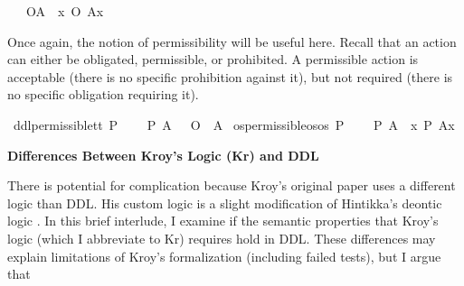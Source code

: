 \begin{isabellebody}
\ \ \ {\isachardoublequoteopen}\isactrlemph O{\isacharbraceleft}A{\isacharbraceright}\ {\isasymequiv}\ {\isasymlambda}x{\isachardot}\ {\isacharparenleft}O\ {\isacharbraceleft}A{\isacharparenleft}x{\isacharparenright}{\isacharbraceright}{\isacharparenright}{\isachardoublequoteclose}%
\begin{isamarkuptext}%
Once again, the notion of permissibility will be useful here. Recall that an action can either be 
obligated, permissible, or prohibited. A permissible action is acceptable (there is no specific prohibition 
against it), but not required (there is no specific obligation requiring it).%
\end{isamarkuptext}\isamarkuptrue%
\isamarkupfalse%
\ ddl{\isacharunderscore}permissible{\isacharcolon}{\isacharcolon}{\isachardoublequoteopen}t{\isasymRightarrow}t{\isachardoublequoteclose}\ {\isacharparenleft}{\isachardoublequoteopen}P\ {\isacharbraceleft}{\isacharunderscore}{\isacharbraceright}{\isachardoublequoteclose}{\isacharparenright}\isanewline
\ \ \ {\isachardoublequoteopen}P\ {\isacharbraceleft}A{\isacharbraceright}\ {\isasymequiv}\ \isactrlbold {\isasymnot}\ {\isacharparenleft}O\ {\isacharbraceleft}\isactrlbold {\isasymnot}\ A{\isacharbraceright}{\isacharparenright}{\isachardoublequoteclose}\isanewline
{}\isamarkupfalse%
\ os{\isacharunderscore}permissible{\isacharcolon}{\isacharcolon}{\isachardoublequoteopen}os{\isasymRightarrow}os{\isachardoublequoteclose}\ {\isacharparenleft}{\isachardoublequoteopen}\isactrlemph P\ {\isacharbraceleft}{\isacharunderscore}{\isacharbraceright}{\isachardoublequoteclose}{\isacharparenright}\isanewline
\ \ \ {\isachardoublequoteopen}\isactrlemph P\ {\isacharbraceleft}A{\isacharbraceright}\ {\isasymequiv}\ {\isasymlambda}x{\isachardot}\ P\ {\isacharbraceleft}A{\isacharparenleft}x{\isacharparenright}{\isacharbraceright}{\isachardoublequoteclose}%
\begin{isamarkuptext}%
\noindent \textbf{Differences Between Kroy's Logic (Kr) and DDL}%
\end{isamarkuptext}\isamarkuptrue%
%
\begin{isamarkuptext}%
There is potential for complication because Kroy's original paper uses a different logic than DDL. 
His custom logic is a slight modification of Hintikka's deontic logic \citep{hintikka}. In this brief interlude, 
I examine if the semantic properties that Kroy's logic (which I abbreviate to Kr) requires 
hold in DDL. These differences may explain limitations of Kroy's formalization (including failed tests), but I argue that 

\end{isamarkuptext}
\end{isabellebody}

